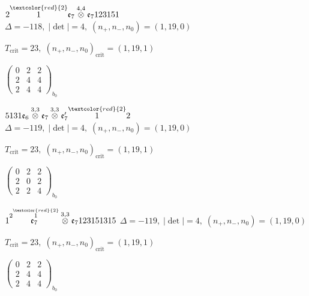 \documentclass[10pt]{article}
\begin{document}
\smallskip

$2\overset{\textcolor{red}{2}}{1}\mathfrak{e}_7\overset{4,4}{\otimes}\mathfrak{e}_7123151$ \quad $\Delta=-118,\; |\det|=4,\; (n_+,n_-,n_0)=(1,19,0)$

\hspace{1em}$T_{\text{crit}}=23,\; (n_+,n_-,n_0)_{\text{crit}}=(1,19,1)$

\hspace{2em}$\left(\begin{smallmatrix}0 & 2 & 2 \\ 2 & 4 & 4 \\ 2 & 4 & 4\end{smallmatrix}\right)_{\!b_0}$

\smallskip

$5131\mathfrak{e}_6\overset{3,3}{\otimes}\mathfrak{e}_7\overset{3,3}{\otimes}\mathfrak{e}_7'\overset{\textcolor{red}{2}}{1}2$ \quad $\Delta=-119,\; |\det|=4,\; (n_+,n_-,n_0)=(1,19,0)$

\hspace{1em}$T_{\text{crit}}=23,\; (n_+,n_-,n_0)_{\text{crit}}=(1,19,1)$

\hspace{2em}$\left(\begin{smallmatrix}0 & 2 & 2 \\ 2 & 0 & 2 \\ 2 & 2 & 4\end{smallmatrix}\right)_{\!b_0}$

\smallskip

$1\overset{2\overset{\textcolor{red}{2}}{1}}{\mathfrak{e}_7}\overset{3,3}{\otimes}\mathfrak{e}_7123151315$ \quad $\Delta=-119,\; |\det|=4,\; (n_+,n_-,n_0)=(1,19,0)$

\hspace{1em}$T_{\text{crit}}=23,\; (n_+,n_-,n_0)_{\text{crit}}=(1,19,1)$

\hspace{2em}$\left(\begin{smallmatrix}0 & 2 & 2 \\ 2 & 4 & 4 \\ 2 & 4 & 4\end{smallmatrix}\right)_{\!b_0}$
\end{document}

